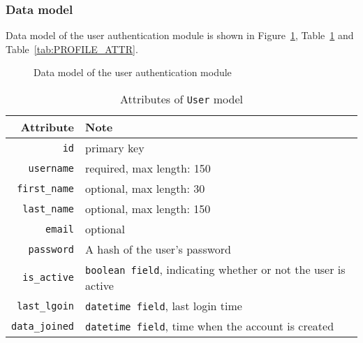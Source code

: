 \subsubsection{Data model}
Data model of the user authentication module is shown in
Figure~\ref{fig:AUTH_ER}, Table~\ref{tab:USR_ATTR} and
Table~\ref{tab:PROFILE_ATTR}.

\bigskip

\begin{figure}[ht]
    \centering
    \caption{Data model of the user authentication module}
    \usetikzlibrary{er}
    \label{fig:AUTH_ER}

\end{figure}


\begin{table}[ht]
    \centering
    \caption{Attributes of \texttt{User} model}
    \label{tab:USR_ATTR}
    \renewcommand{\arraystretch}{1.3}
    \begin{tabular}[ht]{r|l}
        \hline
        Attribute & Note \\
        \hline
        \hline
        \texttt{id} & primary key \\
        \hline
        \texttt{username} &  required, max length: 150 \\
        \hline
        \texttt{first\_name} &  optional, max length: 30 \\
        \hline
        \texttt{last\_name} &  optional, max length: 150 \\
        \hline
        \texttt{email} & optional\\
        \hline
        \texttt{password} & A hash of the user's password \\
        \hline
        \texttt{is\_active} & \texttt{boolean field}, indicating whether or not the user
            is active \\
        \hline
        \texttt{last\_lgoin} & \texttt{datetime field}, last login time \\
        \hline
        \texttt{data\_joined} & \texttt{datetime field}, time when the account is created \\
        \hline
    \end{tabular}
    \renewcommand{\arraystretch}{1}
\end{table}

